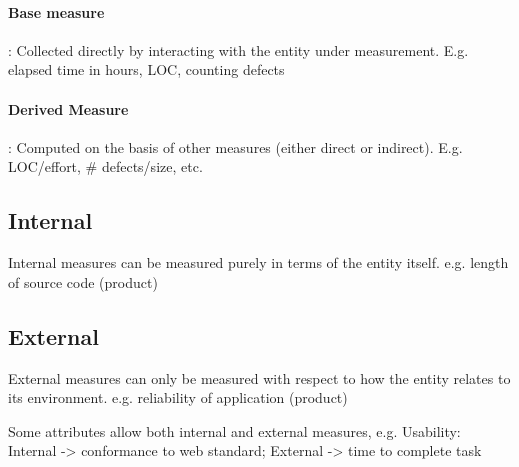 \paragraph{Base measure}: Collected directly by interacting with the entity under
measurement. E.g.  elapsed time in hours, LOC, counting defects
\paragraph{Derived Measure}: Computed on the basis of other measures (either direct or
indirect). E.g. LOC/effort, \# defects/size, etc.




\begin{flushleft}
  \begin{minipage}[t]{0.45\linewidth}
    \raggedright
    \subsection{Internal}

    Internal measures can be measured purely in terms of the
    entity itself. e.g. length of source code (product)

  \end{minipage}%
  \hfill
  \begin{minipage}[t]{0.45\linewidth}
    \raggedright

    \subsection{External}

    External measures can only be measured with respect to
    how the entity relates to its environment. e.g. reliability of application (product)

  \end{minipage}
\end{flushleft}

Some attributes allow both internal and external measures,
e.g. Usability: Internal -> conformance to web standard;
External -> time to complete task

